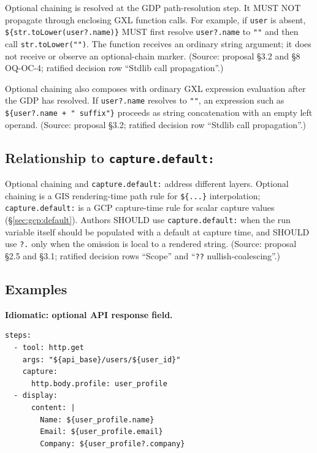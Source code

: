 Optional chaining is resolved at the GDP path-resolution step.  It MUST NOT
propagate through enclosing GXL function calls.  For example, if
\texttt{user} is absent, \texttt{\$\{str.toLower(user?.name)\}} MUST first
resolve \texttt{user?.name} to \texttt{""} and then call
\texttt{str.toLower("")}.  The function receives an ordinary string argument;
it does not receive or observe an optional-chain marker.  (Source: proposal
\S3.2 and \S8 OQ-OC-4; ratified decision row ``Stdlib call propagation''.)

Optional chaining also composes with ordinary GXL expression evaluation after
the GDP has resolved.  If \texttt{user?.name} resolves to \texttt{""}, an
expression such as \texttt{\$\{user?.name + " suffix"\}} proceeds as string
concatenation with an empty left operand.  (Source: proposal \S3.2; ratified
decision row ``Stdlib call propagation''.)

\subsection{Relationship to \texttt{capture.default:}}
\label{subsec:gis:optional-chaining:capture-default}

Optional chaining and \texttt{capture.default:} address different layers.
Optional chaining is a GIS rendering-time path rule for \texttt{\$\{...\}}
interpolation; \texttt{capture.default:} is a GCP capture-time rule for scalar
capture values (\S\ref{sec:gcp:default}).  Authors SHOULD use
\texttt{capture.default:} when the run variable itself should be populated with
a default at capture time, and SHOULD use \texttt{?.} only when the omission is
local to a rendered string.  (Source: proposal \S2.5 and \S3.1; ratified
decision rows ``Scope'' and ``\texttt{??} nullish-coalescing''.)

\subsection{Examples}
\label{subsec:gis:optional-chaining:examples}

\noindent\textbf{Idiomatic: optional API response field.}

\begin{verbatim}
steps:
  - tool: http.get
    args: "${api_base}/users/${user_id}"
    capture:
      http.body.profile: user_profile
  - display:
      content: |
        Name: ${user_profile.name}
        Email: ${user_profile.email}
        Company: ${user_profile?.company}
\end{verbatim}


